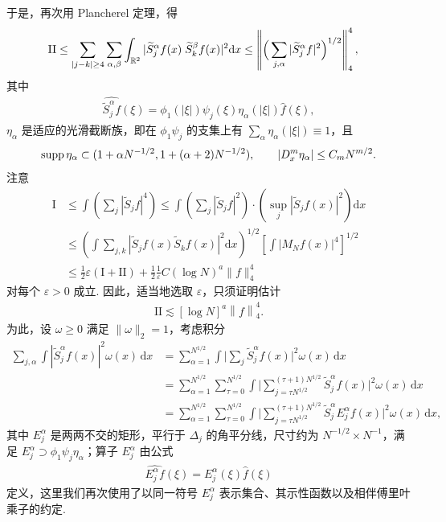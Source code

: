 于是，再次用 Plancherel 定理，得
\begin{align*}
  \mathrm{II}
  &\leq\sum_{|j-k|\geq 4}\sum_{\alpha,\beta}\int_{\mathbb{R}^{2}}|\widetilde{S}_{j}^{\alpha}f(x)\;\widetilde{S}_{k}^{\beta}f(x)|^{2}\mathrm{d}x
  \leq\left\|\Big(\sum_{j,\alpha}|\widetilde{S}_{j}^{\alpha}f|^{2}\Big)^{1/2}\right\|_{4}^{4},
\end{align*}
其中
\begin{align*}
  \widehat{\widetilde{S}_{j}^{\alpha}f}(\xi)=\phi_{1}(|\xi|)\psi_{j}(\xi)\eta_{\alpha}(|\xi|)\widehat{f}(\xi),
\end{align*}
$\eta_\alpha$ 是适应的光滑截断族，即在 $\phi_1\psi_j$ 的支集上有 $\sum_\alpha \eta_\alpha(|\xi|) \equiv 1$，且
\begin{align*}
  \operatorname{supp}\eta_{\alpha}\subset(1+\alpha N^{-1/2},1+(\alpha+2)N^{-1/2}),\qquad
  |D_{x}^{m}\eta_{\alpha}|\leq C_{m}N^{m/2}.
\end{align*}
注意
\begin{align*}
  \mathrm{I}
  &\leq\int\left(\sum_{j}|\widetilde{S}_{j} f|^{4}\right)
  \leq\int\left(\sum_{j}|\widetilde{S}_{j} f|^{2}\right)\cdot\left(\sup_{j}|\widetilde{S}_{j} f(x)|^{2}\right)\mathrm{d}x\\
  &\leq\left(\int\sum_{j,k}|\widetilde{S}_{j} f(x)\widetilde{S}_{k} f(x)|^{2}\mathrm{d}x\right)^{1/2}\left[\int|M_{N} f(x)|^{4}\right]^{1/2}\\
  &\leq\frac{1}{2}\varepsilon\left(\mathrm{I}+\mathrm{II}\right)+\frac{1}{2}\frac{1}{\varepsilon}C\left(\log N\right)^{a}\|f\|_{4}^{4}
\end{align*}
对每个 $\varepsilon > 0$ 成立. 因此，适当地选取 $\varepsilon$，只须证明估计
\begin{align*}
  \mathrm{II}\lesssim[\log N]^{a}\left\|{f}\right\|_{4}^{4}.
\end{align*}
为此，设 $\omega \geq 0$ 满足 $\|\omega\|_2 = 1$，考虑积分
\begin{align*}
  \sum_{j,\alpha}\int|\widetilde{S}_{j}^{\alpha}f(x)|^{2}\omega(x)\,\mathrm{d}x
  &=\sum_{\alpha=1}^{N^{1/2}}\int\Big|\sum_{j}\widetilde{S}_{j}^{\alpha}f(x)\Big|^{2}\omega(x)\,\mathrm{d}x\\
  &=\sum_{\alpha=1}^{N^{1/2}}\sum_{\tau=0}^{N^{1/2}}\int\Big|\sum_{j=\tau N^{1/2}}^{(\tau+1)N^{1/2}}\widetilde{S}_{j}^{\alpha}f(x)\Big|^{2}\omega(x)\,\mathrm{d}x\\
  &=\sum_{\alpha=1}^{N^{1/2}}\sum_{\tau=0}^{N^{1/2}}\int\Big|\sum_{j=\tau N^{1/2}}^{(\tau+1)N^{1/2}}\widetilde{S}_{j}^{\alpha}E_{j}^{\alpha}f(x)\Big|^{2}\omega(x)\,\mathrm{d}x,
\end{align*}
其中 $E_j^\alpha$ 是两两不交的矩形，平行于 $\Delta_j$ 的角平分线，尺寸约为 $N^{-1/2} \times N^{-1}$，满足 $E_j^\alpha \supset \phi_1\psi_j\eta_\alpha$；算子 $E_j^\alpha$ 由公式
\begin{align*}
  \widehat{E_{j}^{\alpha}f}(\xi)=E_{j}^{\alpha}(\xi)\widehat{f}(\xi)
\end{align*}
定义，这里我们再次使用了以同一符号 $E_{j}^{\alpha}$ 表示集合、其示性函数以及相伴傅里叶乘子的约定.

